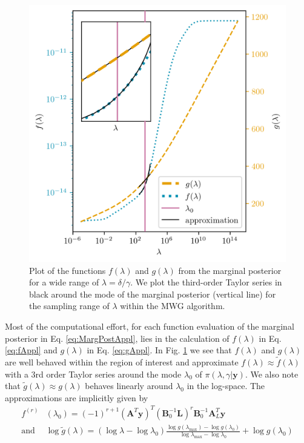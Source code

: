 \begin{figure}[th!]
	\centering
	\includegraphics{f_and_g_phd.png}
	\caption[Plot of the functions $f(\lambda)$ and $g(\lambda)$ for marginal posterior.]{Plot of the functions $f(\lambda)$ and $g(\lambda)$ from the marginal posterior for a wide range of $\lambda = \delta / \gamma$. We plot the third-order Taylor series in black around the mode of the marginal posterior (vertical line) for the sampling range of $\lambda$ within the MWG algorithm.}
	\label{fig:fandg}
\end{figure}
Most of the computational effort, for each function evaluation of the marginal posterior in Eq. \ref{eq:MargPostAppl}, lies in the calculation of $f(\lambda)$ in Eq. \ref{eq:fAppl} and $g(\lambda)$ in Eq. \ref{eq:gAppl}.
In  Fig. \ref{fig:fandg} we see that $f(\lambda)$ and $g(\lambda)$ are well behaved within the region of interest and approximate $f(\lambda) \approx \tilde{f}(\lambda)$ with a 3rd order Taylor series around the mode $\lambda_0$ of $\pi(\lambda, \gamma | \bm{y})$.
We also note that $\tilde{g}(\lambda) \approx g(\lambda)$ behaves linearly around $\lambda_0$ in the log-space.
The approximations are implicitly given by
\begin{align}
	f^{(r)}& (\lambda_0)= (-1)^{r+1} (\bm{A}^T \bm{y})^T (\bm{B}_0^{-1} \bm{L})^r \bm{B}_0^{-1} \bm{A}_L^T \bm{y} \label{eq:ftay}  \\
	\text{and } & \log{ \tilde{g}(\lambda)} = (\log{\lambda} - \log{\lambda_{0}})  \frac{ \log{g(\lambda_{\text{max}})} - \log{g(\lambda_{0})} }{\log{\lambda_{\text{max}}} - \log{\lambda_{0}} } + \log{ g(\lambda_{0})} 
	\label{eq:gtay}
\end{align} 
